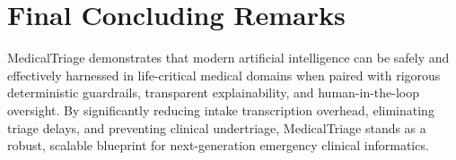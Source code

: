 \documentclass[11pt,a4paper,oneside]{report}
\begin{document}
\section{Final Concluding Remarks}
MedicalTriage demonstrates that modern artificial intelligence can be safely and effectively harnessed in life-critical medical domains when paired with rigorous deterministic guardrails, transparent explainability, and human-in-the-loop oversight. By significantly reducing intake transcription overhead, eliminating triage delays, and preventing clinical undertriage, MedicalTriage stands as a robust, scalable blueprint for next-generation emergency clinical informatics.

\end{document}
